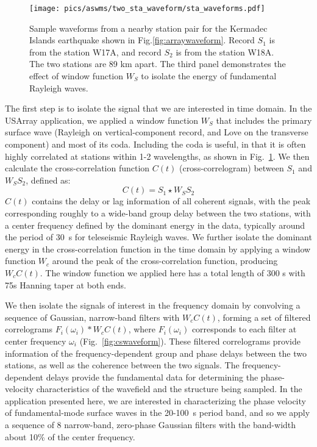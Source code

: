 \begin{figure}
	\center
	\texttt{[image: pics/aswms/two\_sta\_waveform/sta\_waveforms.pdf]}
	\caption{Sample waveforms from a nearby station pair for the Kermadec Islands earthquake shown in Fig.\ref{fig:arraywaveform}. Record $S_1$ is from the station W17A, and record $S_2$ is from the station W18A. The two stations are 89 km apart. The third panel demonstrates the effect of window function $W_S$ to isolate the energy of fundamental Rayleigh waves.}
	\label{fig:twostawaveform}
\end{figure}

The first step is to isolate the signal that we are interested in time domain. In the USArray application, we applied a window function $W_S$ that includes the primary surface wave (Rayleigh on vertical-component record, and Love on the transverse component) and most of its coda. Including the coda is useful, in that it is often highly correlated at stations within 1-2 wavelengths, as shown in Fig.~\ref{fig:twostawaveform}. We then calculate the cross-correlation function $C(t)$ (cross-correlogram) between $S_1$ and $W_SS_2$, defined as:
\begin{equation}
	C(t) = S_1 \star W_S S_2
\end{equation}
$C(t)$ contains the delay or lag information of all coherent signals, with the peak corresponding roughly to a wide-band group delay between the two stations, with a center frequency defined by the dominant energy in the data, typically around the period of 30~s for teleseismic Rayleigh waves. 
We further isolate the dominant energy in the cross-correlation function in the time domain by applying a window function $W_c$ around the peak of the cross-correlation function, producing $W_cC(t)$. The window function we applied here has a total length of 300 s with 75s Hanning taper at both ends.

We then isolate the signals of interest in the frequency domain by convolving a sequence of Gaussian, narrow-band filters with $W_cC(t)$, forming a set of filtered correlograms $F_i(\omega_i) \ast W_c C(t)$, where $F_i(\omega_i)$ corresponds to each filter at center frequency $\omega_i$ (Fig.~\ref{fig:cswaveform}). These filtered correlograms provide information of the frequency-dependent group and phase delays between the two stations, as well as the coherence between the two signals. The frequency-dependent delays provide the fundamental data for determining the phase-velocity characteristics of the wavefield and the structure being sampled.  In the application presented here, we are interested in characterizing the phase velocity of fundamental-mode surface waves in the 20-100~s period band, and so we apply a sequence of 8 narrow-band, zero-phase Gaussian filters with the band-width about 10\% of the center frequency.


